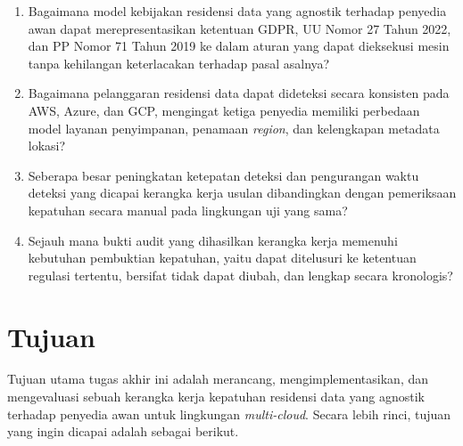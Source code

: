 \begin{enumerate}

\item Bagaimana model kebijakan residensi data yang agnostik terhadap penyedia awan dapat merepresentasikan ketentuan GDPR, UU Nomor 27 Tahun 2022, dan PP Nomor 71 Tahun 2019 ke dalam aturan yang dapat dieksekusi mesin tanpa kehilangan keterlacakan terhadap pasal asalnya?

\item Bagaimana pelanggaran residensi data dapat dideteksi secara konsisten pada AWS, Azure, dan GCP, mengingat ketiga penyedia memiliki perbedaan model layanan penyimpanan, penamaan \textit{region}, dan kelengkapan metadata lokasi?

\item Seberapa besar peningkatan ketepatan deteksi dan pengurangan waktu deteksi yang dicapai kerangka kerja usulan dibandingkan dengan pemeriksaan kepatuhan secara manual pada lingkungan uji yang sama?

\item Sejauh mana bukti audit yang dihasilkan kerangka kerja memenuhi kebutuhan pembuktian kepatuhan, yaitu dapat ditelusuri ke ketentuan regulasi tertentu, bersifat tidak dapat diubah, dan lengkap secara kronologis?

\end{enumerate}


\section{Tujuan}

\label{sec:tujuan}

Tujuan utama tugas akhir ini adalah merancang, mengimplementasikan, dan mengevaluasi sebuah kerangka kerja kepatuhan residensi data yang agnostik terhadap penyedia awan untuk lingkungan \textit{multi-cloud}. Secara lebih rinci, tujuan yang ingin dicapai adalah sebagai berikut.

